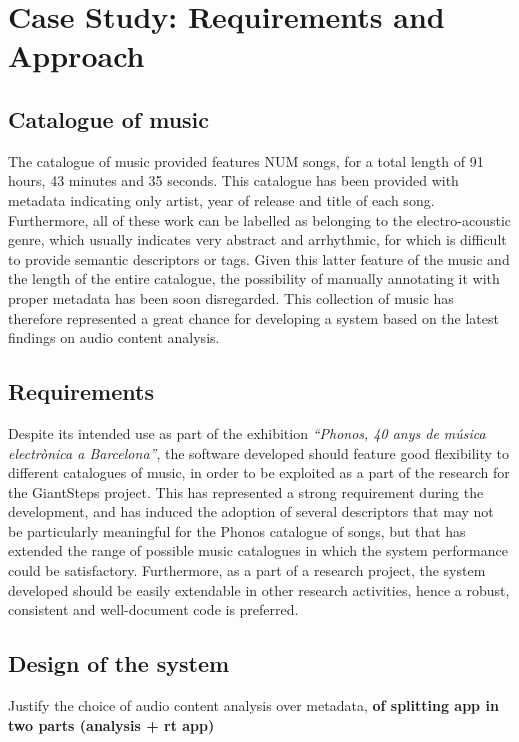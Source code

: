 \chapter{Case Study: Requirements and Approach} %

\label{Chapter4} %


\section{Catalogue of music}
\label{sec:catalogue}
The catalogue of music provided features NUM songs, for a total length of 91 hours, 43 minutes and 35 seconds. This catalogue has been provided with metadata indicating only artist, year of release and title of each song. Furthermore, all of these work can be labelled as belonging to the electro-acoustic genre, which usually indicates very abstract and arrhythmic, for which is difficult to provide semantic descriptors or tags. Given this latter feature of the music and the length of the entire catalogue, the possibility of manually annotating it with proper metadata has been soon disregarded. This collection of music has therefore represented a great chance for developing a system based on the latest findings on audio content analysis.

\section{Requirements}
\label{sec:requirements}
Despite its intended use as part of the exhibition \textit{``Phonos, 40 anys de música electrònica a Barcelona''}, the software developed should feature good flexibility to different catalogues of music, in order to be exploited as a part of the research for the GiantSteps project. This has represented a strong requirement during the development, and has induced the adoption of several descriptors that may not be particularly meaningful for the Phonos catalogue of songs, but that has extended the range of possible music catalogues in which the system performance could be satisfactory. Furthermore, as a part of a research project, the system developed should be easily extendable in other research activities, hence a robust, consistent and well-document code is preferred. \\


\section{Design of the system}
\label{sec:design}

Justify the choice of audio content analysis over metadata, \textbf{of splitting app in two parts (analysis + rt app)}